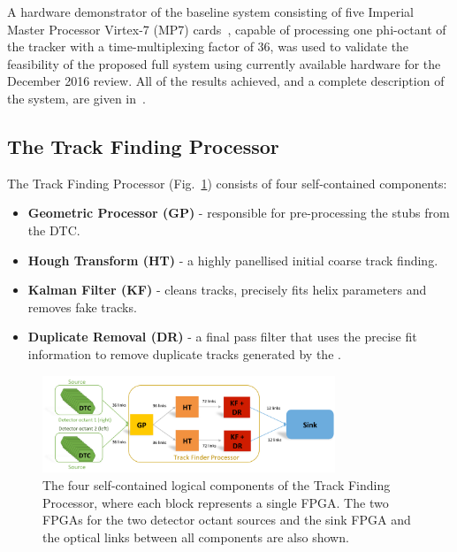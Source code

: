 A hardware demonstrator of the baseline system consisting of five Imperial Master Processor Virtex-7 (MP7) cards~\cite{mp7ref}, capable of processing one phi-octant of the tracker with a time-multiplexing factor of 36, was used to validate the feasibility of the proposed full system using currently available hardware for the December 2016 review.
All of the results achieved, and a complete description of the system, are given in~\cite{TMTT_JINST}.

\subsection{The Track Finding Processor}\label{subsec:TFP}
The Track Finding Processor (Fig.~\ref{fig:TFP}) consists of four self-contained components:
\begin{itemize}
\item {\bf Geometric Processor (GP)} - responsible for pre-processing the stubs from the DTC.
\item {\bf Hough Transform (HT)} - a highly panellised initial coarse track finding.
\item {\bf Kalman Filter (KF)} - cleans tracks, precisely fits helix parameters and removes fake tracks.
\item {\bf Duplicate Removal (DR)} - a final pass filter that uses the precise fit information to remove duplicate tracks generated by the \HT.
\end{itemize}

\begin{figure}[!h]
\centering
\includegraphics[width=0.78\textwidth]{figs/tk-upgrade/demoslice1.pdf}
\caption{The four self-contained logical components of the Track Finding Processor, where each block represents a single FPGA. The two FPGAs for the two detector octant sources and the sink FPGA and the optical links between all components are also shown.}
\label{fig:TFP}
\end{figure}

